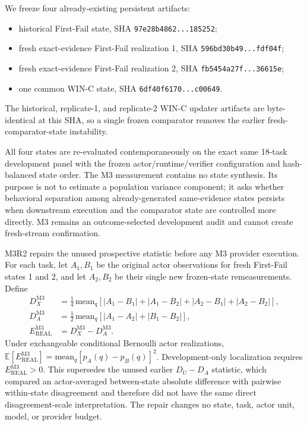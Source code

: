 We freeze four already-existing persistent artifacts:
\begin{itemize}
    \item historical First-Fail state, SHA \texttt{97e28b4862...185252};
    \item fresh exact-evidence First-Fail realization 1, SHA \texttt{596bd30b49...fdf04f};
    \item fresh exact-evidence First-Fail realization 2, SHA \texttt{fb5454a27f...36615e};
    \item one common WIN-C state, SHA \texttt{6df40f6170...c00649}.
\end{itemize}
The historical, replicate-1, and replicate-2 WIN-C updater artifacts are byte-identical at this SHA, so a single frozen comparator removes the earlier fresh-comparator-state instability.

All four states are re-evaluated contemporaneously on the exact same 18-task development panel with the frozen actor/runtime/verifier configuration and hash-balanced state order. The M3 measurement contains no state synthesis. Its purpose is not to estimate a population variance component; it asks whether behavioral separation among already-generated same-evidence states persists when downstream execution and the comparator state are controlled more directly. M3 remains an outcome-selected development audit and cannot create fresh-stream confirmation.

M3R2 repairs the unused prospective statistic before any M3 provider execution. For each task, let $A_1,B_1$ be the original actor observations for fresh First-Fail states 1 and 2, and let $A_2,B_2$ be their single new frozen-state remeasurements. Define
\begin{align}
D_X^{\mathrm{M3}} &= \tfrac{1}{4}\,\mathrm{mean}_q\left[|A_1-B_1|+|A_1-B_2|+|A_2-B_1|+|A_2-B_2|\right],\\
D_A^{\mathrm{M3}} &= \tfrac{1}{2}\,\mathrm{mean}_q\left[|A_1-A_2|+|B_1-B_2|\right],\\
E_{\mathrm{REAL}}^{\mathrm{M3}} &= D_X^{\mathrm{M3}}-D_A^{\mathrm{M3}}.
\end{align}
Under exchangeable conditional Bernoulli actor realizations, $\mathbb{E}[E_{\mathrm{REAL}}^{\mathrm{M3}}]=\mathrm{mean}_q[p_A(q)-p_B(q)]^2$. Development-only localization requires $E_{\mathrm{REAL}}^{\mathrm{M3}}>0$. This supersedes the unused earlier $D_U-D_A$ statistic, which compared an actor-averaged between-state absolute difference with pairwise within-state disagreement and therefore did not have the same direct disagreement-scale interpretation. The repair changes no state, task, actor unit, model, or provider budget.

